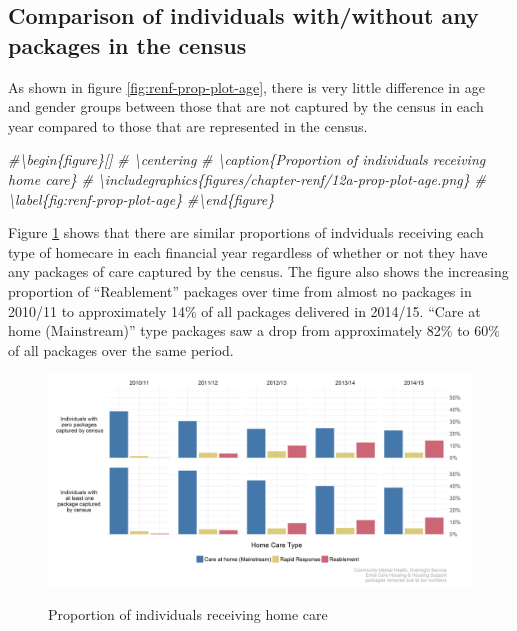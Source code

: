 \documentclass[]{article}
\newenvironment{Shaded}{\begin{snugshade}}{\end{snugshade}}
\newcommand{\CommentTok}[1]{\textcolor[rgb]{0.56,0.35,0.01}{\textit{#1}}}
\begin{document}
\FloatBarrier
\subsection{Comparison of individuals with/without any packages in the census}\label{subsec:renf-pack-diff}

As shown in figure \ref{fig:renf-prop-plot-age}, there is very little
difference in age and gender groups between those that are not captured
by the census in each year compared to those that are represented in the
census.

\begin{Shaded}
\begin{Highlighting}[]
\CommentTok{#\textbackslash{}begin\{figure\}[]}
\CommentTok{#  \textbackslash{}centering}
\CommentTok{#    \textbackslash{}caption\{Proportion of individuals receiving home care\}}
\CommentTok{#    \textbackslash{}includegraphics\{figures/chapter-renf/12a-prop-plot-age.png\}}
\CommentTok{#    \textbackslash{}label\{fig:renf-prop-plot-age\}}
\CommentTok{#\textbackslash{}end\{figure\}}
\end{Highlighting}
\end{Shaded}

Figure \ref{fig:renf-prop-plot} shows that there are similar proportions
of indviduals receiving each type of homecare in each financial year
regardless of whether or not they have any packages of care captured by
the census. The figure also shows the increasing proportion of
``Reablement'' packages over time from almost no packages in 2010/11 to
approximately 14\% of all packages delivered in 2014/15. ``Care at home
(Mainstream)'' type packages saw a drop from approximately 82\% to 60\%
of all packages over the same period.

\begin{figure}[]
  \centering
    \caption{Proportion of individuals receiving home care}
    \includegraphics{figures/chapter-renf/12-census-prop-plot.png}
    \label{fig:renf-prop-plot}
\end{figure}
\end{document}
